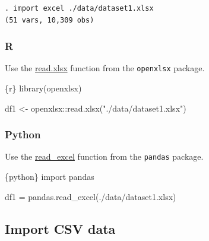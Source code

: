 \documentclass[
  letterpaper,
  DIV=11,
  numbers=noendperiod]{scrreprt}
\newenvironment{Shaded}{\begin{snugshade}}{\end{snugshade}}
\newcommand{\FunctionTok}[1]{\textcolor[rgb]{0.28,0.35,0.67}{#1}}
\newcommand{\ImportTok}[1]{\textcolor[rgb]{0.00,0.46,0.62}{#1}}
\newcommand{\InformationTok}[1]{\textcolor[rgb]{0.37,0.37,0.37}{#1}}
\newcommand{\NormalTok}[1]{\textcolor[rgb]{0.00,0.23,0.31}{#1}}
\newcommand{\OperatorTok}[1]{\textcolor[rgb]{0.37,0.37,0.37}{#1}}
\newcommand{\OtherTok}[1]{\textcolor[rgb]{0.00,0.23,0.31}{#1}}
\newcommand{\SpecialCharTok}[1]{\textcolor[rgb]{0.37,0.37,0.37}{#1}}
\newcommand{\StringTok}[1]{\textcolor[rgb]{0.13,0.47,0.30}{#1}}
\begin{document}
\begin{verbatim}
. import excel ./data/dataset1.xlsx
(51 vars, 10,309 obs)
\end{verbatim}

\hypertarget{r}{%
\subsubsection{R}\label{r}}

Use the
\href{https://www.rdocumentation.org/packages/openxlsx/versions/4.2.5/topics/read.xlsx}{read.xlsx}
function from the \texttt{openxlsx} package.

\begin{Shaded}
\begin{Highlighting}[]
\InformationTok{\textasciigrave{}\textasciigrave{}\textasciigrave{}\{r\}}
\FunctionTok{library}\NormalTok{(openxlsx)}

\NormalTok{df1 }\OtherTok{\textless{}{-}}\NormalTok{ openxlsx}\SpecialCharTok{::}\FunctionTok{read.xlsx}\NormalTok{(}\StringTok{"./data/dataset1.xlsx"}\NormalTok{)}
\InformationTok{\textasciigrave{}\textasciigrave{}\textasciigrave{}}
\end{Highlighting}
\end{Shaded}

\hypertarget{python}{%
\subsubsection{Python}\label{python}}

Use the
\href{https://pandas.pydata.org/docs/reference/api/pandas.read_excel.html}{read\_excel}
function from the \texttt{pandas} package.

\begin{Shaded}
\begin{Highlighting}[]
\InformationTok{\textasciigrave{}\textasciigrave{}\textasciigrave{}\{python\}}
\ImportTok{import}\NormalTok{ pandas}

\NormalTok{df1 }\OperatorTok{=}\NormalTok{ pandas.read\_excel(}\StringTok{\textquotesingle{}./data/dataset1.xlsx\textquotesingle{}}\NormalTok{)}
\InformationTok{\textasciigrave{}\textasciigrave{}\textasciigrave{}}
\end{Highlighting}
\end{Shaded}

\hypertarget{import-csv-data}{%
\subsection{Import CSV data}\label{import-csv-data}}
\end{document}
